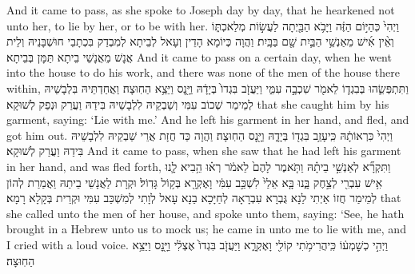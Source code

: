 {And it came to pass, as she spoke to Joseph day by day, that he hearkened not unto her, to lie by her, or to be with her.}{}
{וַיְהִי֙ כְּהַיּ֣וֹם הַזֶּ֔ה וַיָּבֹ֥א הַבַּ֖יְתָה לַעֲשׂ֣וֹת מְלַאכְתּ֑וֹ וְאֵ֨ין אִ֜ישׁ מֵאַנְשֵׁ֥י הַבַּ֛יִת שָׁ֖ם בַּבָּֽיִת׃}
{וַהֲוָה כְּיוֹמָא הָדֵין וְעָאל לְבֵיתָא לְמִבְדַק בִּכְתָבֵי חוּשְׁבָּנֵיהּ וְלֵית אֲנָשׁ מֵאֲנָשֵׁי בֵיתָא תַּמָּן בְּבֵיתָא׃}
{And it came to pass on a certain day, when he went into the house to do his work, and there was none of the men of the house there within,}{}
{וַתִּתְפְּשֵׂ֧הוּ בְּבִגְד֛וֹ לֵאמֹ֖ר שִׁכְבָ֣ה עִמִּ֑י וַיַּעֲזֹ֤ב בִּגְדוֹ֙ בְּיָדָ֔הּ וַיָּ֖נׇס וַיֵּצֵ֥א הַחֽוּצָה׃}
{וַאֲחַדְתֵּיהּ בִּלְבָשֵׁיהּ לְמֵימַר שְׁכוֹב עִמִּי וְשַׁבְקֵיהּ לִלְבָשֵׁיהּ בִּידַהּ וַעֲרַק וּנְפַק לְשׁוּקָא׃}
{that she caught him by his garment, saying: ‘Lie with me.’ And he left his garment in her hand, and fled, and got him out.}{}
{וַיְהִי֙ כִּרְאוֹתָ֔הּ כִּֽי\maqqaf עָזַ֥ב בִּגְד֖וֹ בְּיָדָ֑הּ וַיָּ֖נׇס הַחֽוּצָה׃}
{וַהֲוָה כַּד חֲזָת אֲרֵי שַׁבְקֵיהּ לִלְבָשֵׁיהּ בִּידַהּ וַעֲרַק לְשׁוּקָא׃}
{And it came to pass, when she saw that he had left his garment in her hand, and was fled forth,}{}
{וַתִּקְרָ֞א לְאַנְשֵׁ֣י בֵיתָ֗הּ וַתֹּ֤אמֶר לָהֶם֙ לֵאמֹ֔ר רְא֗וּ הֵ֥בִיא לָ֛נוּ אִ֥ישׁ עִבְרִ֖י לְצַ֣חֶק בָּ֑נוּ בָּ֤א אֵלַי֙ לִשְׁכַּ֣ב עִמִּ֔י וָאֶקְרָ֖א בְּק֥וֹל גָּדֽוֹל׃}
{וּקְרָת לַאֲנָשֵׁי בֵיתַהּ וַאֲמַרַת לְהוֹן לְמֵימַר חֲזוֹ אַיְתִי לַנָא גֻּבְרָא עִבְרָאָה לְחַיָּכָא בַנָא עָאל לְוָתִי לְמִשְׁכַּב עִמִּי וּקְרֵית בְּקָלָא רָמָא׃}
{that she called unto the men of her house, and spoke unto them, saying: ‘See, he hath brought in a Hebrew unto us to mock us; he came in unto me to lie with me, and I cried with a loud voice.}{}
{וַיְהִ֣י כְשׇׁמְע֔וֹ כִּֽי\maqqaf הֲרִימֹ֥תִי קוֹלִ֖י וָאֶקְרָ֑א וַיַּעֲזֹ֤ב בִּגְדוֹ֙ אֶצְלִ֔י וַיָּ֖נׇס וַיֵּצֵ֥א הַחֽוּצָה׃}
